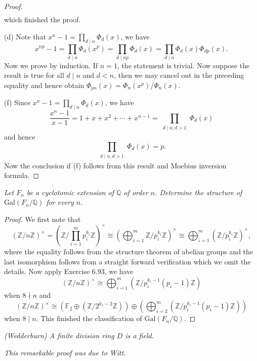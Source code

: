 \begin{proof}
$$\begin{aligned}
\end{aligned}
$$
which finished the proof.\par
(d) Note that $x^n-1=\prod_{d\mid n}{\Phi _d\left( x \right)}$, we have 
$$
x^{np}-1=\prod_{d\mid n}{\Phi _d\left( x^p \right)}=\prod_{d\mid np}{\Phi _d\left( x \right)}=\prod_{d\mid n}{\Phi _d\left( x \right) \Phi _{dp}\left( x \right)}.
$$
Now we prove by induction. If $n=1$, the statement is trivial. Now suppose the result is true for all $d\mid n$ and $d<n$, then we may cancel out in the preceding equality and hence obtain $\Phi_{pn}(x)=\Phi_n(x^p)/\Phi_n(x)$.\par
(f) Since $x^n-1=\prod_{d\mid n}{\Phi _d\left( x \right)}$, we have 
$$
\frac{x^n-1}{x-1}=1+x+x^2+\cdots +x^{n-1}=\prod_{\substack{d\mid n,d>1}}\Phi _d\left( x \right)
$$
and hence 
$$
\prod_{\substack{d\mid n,d>1}}\Phi _d\left( x \right)=p.
$$
Now the conclusion if (f) follows from this result and Moebius inversion formula.
\end{proof}
\begin{problem}\em
Let $F_n$ be a cyclotomic extension of $\mathbb{Q}$ of order $n$. Determine the structure of $\mathrm{Gal}(F_n/\mathbb{Q})$ for every $n$.
\end{problem}
\begin{proof}
We first note that 
$$
\left( \mathbb{Z} /n\mathbb{Z} \right) ^{\times}=\left( \mathbb{Z} /\prod_{i=1}^m{p_{i}^{k_i}\mathbb{Z}} \right) ^{\times}\cong \left( \bigoplus_{i=1}^m{\mathbb{Z} /p_{i}^{k_i}\mathbb{Z}} \right) ^{\times}\cong \bigoplus_{i=1}^m{\left( \mathbb{Z} /p_{i}^{k_i}\mathbb{Z} \right) ^{\times}},
$$
where the equality follows from the structure theorem of abelian groups and the last isomorphism follows from a straight forward verification which we omit the details. Now apply Exercise 6.93, we have 
$$
\left( \mathbb{Z} /n\mathbb{Z} \right) ^{\times}\cong \bigoplus_{i=1}^m{\left( \mathbb{Z} /p_{i}^{k_i-1}\left( p_i-1 \right) \mathbb{Z} \right)}
$$
when $8\nmid n$ and 
$$
\left( \mathbb{Z} /n\mathbb{Z} \right) ^{\times}\cong \left( \mathbb{F} _2\oplus \left( \mathbb{Z} /2^{k_1-2}\mathbb{Z} \right) \right) \oplus \left( \bigoplus_{i=2}^m{\left( \mathbb{Z} /p_{i}^{k_i-1}\left( p_i-1 \right) \mathbb{Z} \right)} \right) 
$$
when $8\mid n$. This finished the classification of $\mathrm{Gal}(F_n/\mathbb{Q})$.
\end{proof}
\begin{problem}\em
(Wedderburn) A finite division ring $D$ is a field.
\end{problem}
\begin{note}\em
This remarkable proof was due to Witt.
\end{note}
